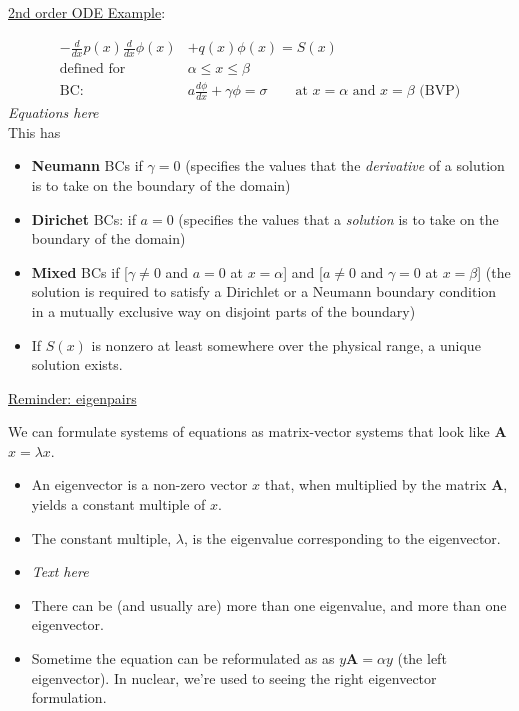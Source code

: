 \documentclass[12pt]{exam}
\newcommand{\ve}[1]{\ensuremath{\mathbf{#1}}}
\begin{document}
\vspace*{1em}
\underline{2nd order ODE Example}:

\ifprintanswers
\begin{align}
-\frac{d}{dx}p(x) \frac{d}{dx}\phi(x) &+ q(x)\phi(x) = S(x) \nonumber \\
\text{defined for }& \alpha \le x \le \beta \nonumber \\
\text{BC: }& a\frac{d\phi}{dx} + \gamma \phi = \sigma \qquad \text{at } x=\alpha \text{ and } x = \beta \text{ (BVP)}\nonumber
\end{align}
\else
 \hspace*{8em}\textit{Equations here}\\
\fi
%
This has
\begin{itemize}
\item \textbf{Neumann} BCs if $\gamma = 0$ (specifies the values that the \textit{derivative} of a solution is to take on the boundary of the domain)
\item \textbf{Dirichet} BCs: if $a=0$ (specifies the values that a \textit{solution} is to take on the boundary of the domain)
\item \textbf{Mixed} BCs if [$\gamma \ne 0$ and $a = 0$ at $x = \alpha$] and [$a \ne 0$ and $\gamma = 0$ at $x = \beta$] (the solution is required to satisfy a Dirichlet or a Neumann boundary condition in a mutually exclusive way on disjoint parts of the boundary)
\item If $S(x)$ is nonzero at least somewhere over the physical range, a unique solution exists.
\end{itemize}

\vspace*{1 em} \underline{Reminder: eigenpairs}

We can formulate systems of equations as matrix-vector systems that look like \ve{A}$x = \lambda x$. 
\begin{itemize}
\item An eigenvector is a non-zero vector $x$ that, when multiplied by the matrix \ve{A}, yields a constant multiple of $x$. 
\ifprintanswers
\item The constant multiple, $\lambda$, is the eigenvalue corresponding to the eigenvector.
\else
 \item \textit{Text here}
\fi
\item There can be (and usually are) more than one eigenvalue, and more than one eigenvector. 
\item Sometime the equation can be reformulated as as $y\ve{A} = \alpha y$ (the left eigenvector). In nuclear, we're used to seeing the right eigenvector formulation.
\end{itemize}
\end{document}
